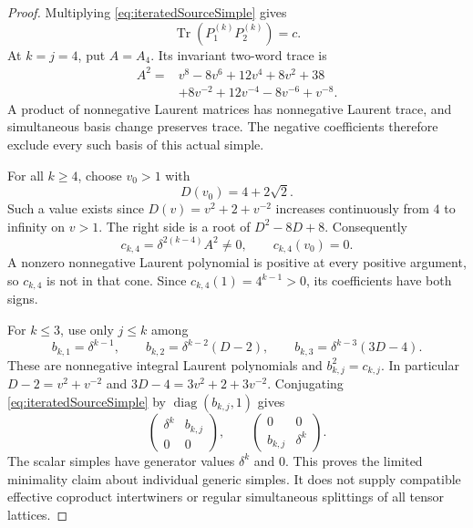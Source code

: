 \documentclass[11pt,a4paper]{article}
\theoremstyle{named}\newtheorem{finding}{Finding}[section]
\theoremstyle{definition}\newtheorem{definition}[finding]{Definition}
\theoremstyle{remark}\newtheorem{remark}[finding]{Remark}
\begin{document}
\begin{proof}
Multiplying \eqref{eq:iteratedSourceSimple} gives
\[
 \operatorname{Tr}(P_1^{(k)}P_2^{(k)})=c.
\]
At \(k=j=4\), put \(A=A_4\). Its invariant two-word trace is
\begin{equation}\label{eq:iteratedNegativeTrace}
 \begin{split}
 A^2={}&v^8-8v^6+12v^4+8v^2+38\\
       &+8v^{-2}+12v^{-4}-8v^{-6}+v^{-8}.
 \end{split}
\end{equation}
A product of nonnegative Laurent matrices has nonnegative
Laurent trace, and simultaneous basis change preserves trace.
The negative coefficients therefore exclude every such basis
of this actual simple.

For all \(k\ge4\), choose \(v_0>1\) with
\[
 D(v_0)=4+2\sqrt2.
\]
Such a value exists since \(D(v)=v^2+2+v^{-2}\)
increases continuously from \(4\) to infinity on \(v>1\).
The right side is a root of \(D^2-8D+8\). Consequently
\[
 c_{k,4}=\delta^{2(k-4)}A^2\ne0,\qquad c_{k,4}(v_0)=0.
\]
A nonzero nonnegative Laurent polynomial is positive at
every positive argument, so \(c_{k,4}\) is not in that cone.
Since \(c_{k,4}(1)=4^{k-1}>0\), its coefficients have both signs.

For \(k\le3\), use only \(j\le k\) among
\[
 b_{k,1}=\delta^{k-1},\qquad
 b_{k,2}=\delta^{k-2}(D-2),\qquad
 b_{k,3}=\delta^{k-3}(3D-4).
\]
These are nonnegative integral Laurent polynomials and
\(b_{k,j}^2=c_{k,j}\). In particular
\(D-2=v^2+v^{-2}\) and \(3D-4=3v^2+2+3v^{-2}\).
Conjugating \eqref{eq:iteratedSourceSimple} by
\(\operatorname{diag}(b_{k,j},1)\) gives
\[
 \begin{pmatrix}\delta^k&b_{k,j}\\0&0\end{pmatrix},
 \qquad
 \begin{pmatrix}0&0\\b_{k,j}&\delta^k\end{pmatrix}.
\]
The scalar simples have generator values \(\delta^k\) and \(0\).
This proves the limited minimality claim about individual
generic simples. It does not supply compatible effective
coproduct intertwiners or regular simultaneous splittings
of all tensor lattices.


\end{proof}
\end{document}
